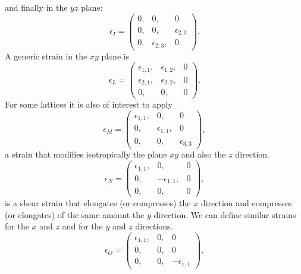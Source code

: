 \documentclass[12pt,a4paper]{article}
\begin{document}
and finally in the $yz$ plane:
\begin{equation}
\epsilon_I=\left( \begin{array}{ccc}
0, & 0, & 0
\\
0, & 0, & \epsilon_{2,3} 
\\
0, & \epsilon_{2,3}, & 0
\end{array}
\right).
\end{equation}
A generic strain in the $xy$ plane is
\begin{equation}
\epsilon_L=\left( \begin{array}{ccc}
\epsilon_{1,1}, & \epsilon_{1,2}, & 0 
\\
\epsilon_{2,1}, & \epsilon_{2,2}, & 0 
\\
0, & 0, & 0
\end{array}
\right).
\end{equation}
For some lattices it is also of interest to apply
\begin{equation}
\epsilon_M=\left( \begin{array}{ccc}
\epsilon_{1,1}, & 0, & 0 
\\
0, & \epsilon_{1,1}, & 0 
\\
0, & 0, & \epsilon_{3,3}
\end{array}
\right),
\end{equation}
a strain that modifies isotropically the plane $xy$ and also the $z$ direction.
\begin{equation}
\epsilon_N=\left( \begin{array}{ccc}
\epsilon_{1,1}, & 0, & 0 
\\
0, & -\epsilon_{1,1}, & 0 
\\
0, & 0, & 0
\end{array}
\right),
\end{equation}
is a shear strain that elongates (or compresses) the $x$ direction and
compresses (or elongates) of the same amount the $y$ direction.
We can define similar strains for the $x$ and $z$ and for 
the $y$ and $z$ directions.
\begin{equation}
\epsilon_O=\left( \begin{array}{ccc}
\epsilon_{1,1}, & 0, & 0 
\\
0, & 0, & 0 
\\
0, & 0, & -\epsilon_{1,1}
\end{array}
\right),
\end{equation}
\end{document}
